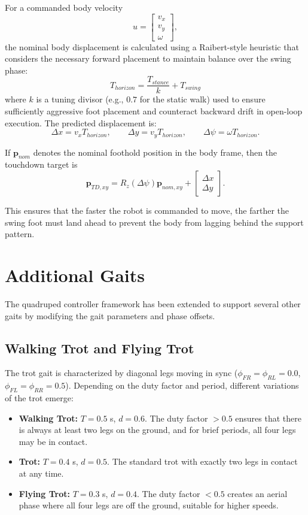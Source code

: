 \documentclass[11pt,a4paper]{report}
\begin{document}
For a commanded body velocity
\[
u =
\begin{bmatrix}
v_x\\
v_y\\
\omega
\end{bmatrix},
\]
the nominal body displacement is calculated using a Raibert-style heuristic that considers the necessary forward placement to maintain balance over the swing phase:
\[
T_{horizon} = \frac{T_{stance}}{k} + T_{swing}
\]
where $k$ is a tuning divisor (e.g., $0.7$ for the static walk) used to ensure sufficiently aggressive foot placement and counteract backward drift in open-loop execution. The predicted displacement is:
\[
\Delta x = v_x T_{horizon}, \qquad
\Delta y = v_y T_{horizon}, \qquad
\Delta \psi = \omega T_{horizon}.
\]

If \(\mathbf{p}_{nom}\) denotes the nominal foothold position in the body frame, then the touchdown target is
\[
\mathbf{p}_{TD,xy} = R_z(\Delta \psi)\mathbf{p}_{nom,xy}
+ \begin{bmatrix}
\Delta x\\
\Delta y
\end{bmatrix}.
\]

This ensures that the faster the robot is commanded to move, the farther the swing foot must land ahead to prevent the body from lagging behind the support pattern.

\chapter{Additional Gaits}
The quadruped controller framework has been extended to support several other gaits by modifying the gait parameters and phase offsets. 

\section{Walking Trot and Flying Trot}
The trot gait is characterized by diagonal legs moving in sync ($\phi_{FR}=\phi_{RL}=0.0$, $\phi_{FL}=\phi_{RR}=0.5$). Depending on the duty factor and period, different variations of the trot emerge:
\begin{itemize}
    \item \textbf{Walking Trot:} $T = 0.5$ s, $d = 0.6$. The duty factor $> 0.5$ ensures that there is always at least two legs on the ground, and for brief periods, all four legs may be in contact.
    \item \textbf{Trot:} $T = 0.4$ s, $d = 0.5$. The standard trot with exactly two legs in contact at any time.
    \item \textbf{Flying Trot:} $T = 0.3$ s, $d = 0.4$. The duty factor $< 0.5$ creates an aerial phase where all four legs are off the ground, suitable for higher speeds.
\end{itemize}
\end{document}
